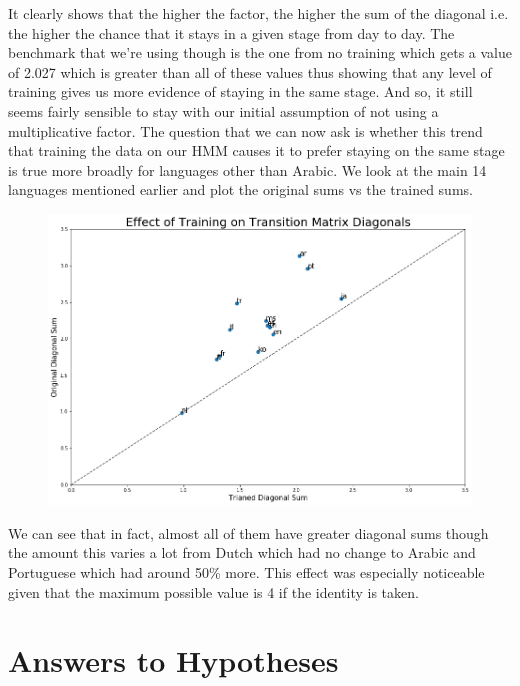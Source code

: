 \documentclass[12pt]{article}
\begin{document}
It clearly shows that the higher the factor, the higher the sum of the diagonal i.e. the higher the chance that it stays in a given stage from day to day. The benchmark that we're using though is the one from no training which gets a value of 2.027 which is greater than all of these values thus showing that any level of training gives us more evidence of staying in the same stage. And so, it still seems fairly sensible to stay with our initial assumption of not using a multiplicative factor. The question that we can now ask is whether this trend that training the data on our HMM causes it to prefer staying on the same stage is true more broadly for languages other than Arabic. We look at the main 14 languages mentioned earlier and plot the original sums vs the trained sums.
\FloatBarrier
\begin{figure}[hbtp]\centering
\includegraphics[width=\textwidth,clip]{images/TrainingEffectDiagonals.png}
\end{figure}
\FloatBarrier

We can see that in fact, almost all of them have greater diagonal sums though the amount this varies a lot from Dutch which had no change to Arabic and Portuguese which had around 50\% more. This effect was especially noticeable given that the maximum possible value is 4 if the identity is taken.

\newpage
\section{Answers to Hypotheses}
\end{document}
